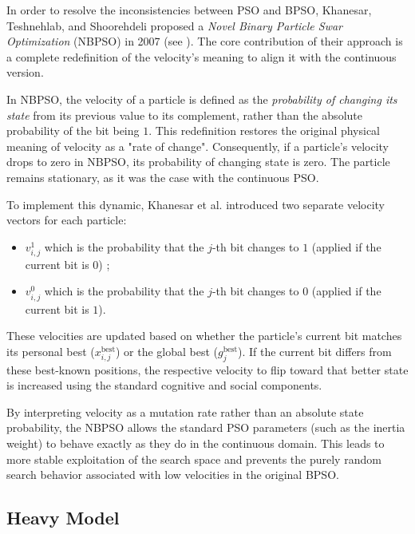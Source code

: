 \documentclass[12pt, openany]{article}
\begin{document}
In order to resolve the inconsistencies between PSO and BPSO, Khanesar, Teshnehlab, and Shoorehdeli proposed a \emph{Novel Binary Particle Swar Optimization} (NBPSO) in 2007 (see \cite{4433821}). The core contribution of their approach is a complete redefinition of the velocity's meaning to align it with the continuous version.

In NBPSO, the velocity of a particle is defined as the \emph{probability of changing its state} from its previous value to its complement, rather than the absolute probability of the bit being $1$. This redefinition restores the original physical meaning of velocity as a "rate of change". Consequently, if a particle's velocity drops to zero in NBPSO, its probability of changing state is zero. The particle remains stationary, as it was the case with the continuous PSO.

To implement this dynamic, Khanesar et al. introduced two separate velocity vectors for each particle:
\begin{itemize}
    \item $v_{i,j}^1$ which is the probability that the $j$-th bit changes to $1$ (applied if the current bit is $0$) ;
    \item $v_{i,j}^0$ which is the probability that the $j$-th bit changes to $0$ (applied if the current bit is $1$).
\end{itemize}

These velocities are updated based on whether the particle's current bit matches its personal best ($x_{i,j}^{\text{best}}$) or the global best ($g_j^{\text{best}}$). If the current bit differs from these best-known positions, the respective velocity to flip toward that better state is increased using the standard cognitive and social components.

By interpreting velocity as a mutation rate rather than an absolute state probability, the NBPSO allows the standard PSO parameters (such as the inertia weight) to behave exactly as they do in the continuous domain. This leads to more stable exploitation of the search space and prevents the purely random search behavior associated with low velocities in the original BPSO.



\subsection{Heavy Model}\label{sec:heavy_model}
\end{document}
